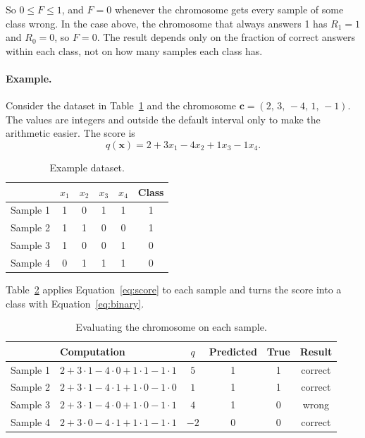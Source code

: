 \documentclass[11pt,a4paper]{article}
\newcommand{\chrom}{\mathbf{c}}
\begin{document}
So $0 \leq F \leq 1$, and $F = 0$ whenever the chromosome gets every sample of some
class wrong. In the case above, the chromosome that always answers 1 has $R_1 = 1$ and
$R_0 = 0$, so $F = 0$. The result depends only on the fraction of correct answers
within each class, not on how many samples each class has.

\paragraph{Example.} Consider the dataset in Table~\ref{tab:data} and the chromosome
$\chrom = (2,\, 3,\, -4,\, 1,\, -1)$. The values are integers and outside the default
interval only to make the arithmetic easier. The score is
\begin{equation*}
  q(\mathbf{x}) = 2 + 3x_1 - 4x_2 + 1x_3 - 1x_4.
\end{equation*}

\begin{table}[ht]
\centering
\caption{Example dataset.}
\label{tab:data}
\begin{tabular}{lccccc}
\toprule
 & $x_1$ & $x_2$ & $x_3$ & $x_4$ & Class \\
\midrule
Sample 1 & 1 & 0 & 1 & 1 & 1 \\
Sample 2 & 1 & 1 & 0 & 0 & 1 \\
Sample 3 & 1 & 0 & 0 & 1 & 0 \\
Sample 4 & 0 & 1 & 1 & 1 & 0 \\
\bottomrule
\end{tabular}
\end{table}

Table~\ref{tab:evaluation} applies Equation~\eqref{eq:score} to each sample and turns
the score into a class with Equation~\eqref{eq:binary}.

\begin{table}[ht]
\centering
\caption{Evaluating the chromosome on each sample.}
\label{tab:evaluation}
\begin{tabular}{llcccc}
\toprule
 & Computation & $q$ & Predicted & True & Result \\
\midrule
Sample 1 & $2 + 3\cdot1 - 4\cdot0 + 1\cdot1 - 1\cdot1$ & $5$  & 1 & 1 & correct \\
Sample 2 & $2 + 3\cdot1 - 4\cdot1 + 1\cdot0 - 1\cdot0$ & $1$  & 1 & 1 & correct \\
Sample 3 & $2 + 3\cdot1 - 4\cdot0 + 1\cdot0 - 1\cdot1$ & $4$  & 1 & 0 & wrong \\
Sample 4 & $2 + 3\cdot0 - 4\cdot1 + 1\cdot1 - 1\cdot1$ & $-2$ & 0 & 0 & correct \\
\bottomrule
\end{tabular}
\end{table}
\end{document}
